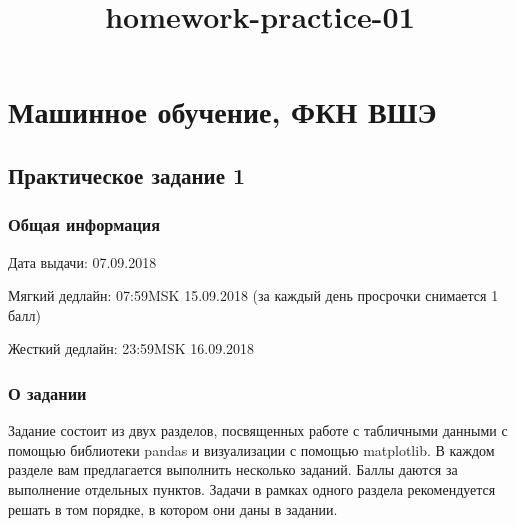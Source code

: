 \documentclass[11pt]{article}
\title{homework-practice-01}
\begin{document}
    
    
    \maketitle
    
    

    
    \hypertarget{ux43cux430ux448ux438ux43dux43dux43eux435-ux43eux431ux443ux447ux435ux43dux438ux435-ux444ux43aux43d-ux432ux448ux44d}{%
\section{Машинное обучение, ФКН
ВШЭ}\label{ux43cux430ux448ux438ux43dux43dux43eux435-ux43eux431ux443ux447ux435ux43dux438ux435-ux444ux43aux43d-ux432ux448ux44d}}

\hypertarget{ux43fux440ux430ux43aux442ux438ux447ux435ux441ux43aux43eux435-ux437ux430ux434ux430ux43dux438ux435-1}{%
\subsection{Практическое задание
1}\label{ux43fux440ux430ux43aux442ux438ux447ux435ux441ux43aux43eux435-ux437ux430ux434ux430ux43dux438ux435-1}}

\hypertarget{ux43eux431ux449ux430ux44f-ux438ux43dux444ux43eux440ux43cux430ux446ux438ux44f}{%
\subsubsection{Общая
информация}\label{ux43eux431ux449ux430ux44f-ux438ux43dux444ux43eux440ux43cux430ux446ux438ux44f}}

Дата выдачи: 07.09.2018

Мягкий дедлайн: 07:59MSK 15.09.2018 (за каждый день просрочки снимается
1 балл)

Жесткий дедлайн: 23:59MSK 16.09.2018

    \hypertarget{ux43e-ux437ux430ux434ux430ux43dux438ux438}{%
\subsubsection{О
задании}\label{ux43e-ux437ux430ux434ux430ux43dux438ux438}}

Задание состоит из двух разделов, посвященных работе с табличными
данными с помощью библиотеки pandas и визуализации с помощью matplotlib.
В каждом разделе вам предлагается выполнить несколько заданий. Баллы
даются за выполнение отдельных пунктов. Задачи в рамках одного раздела
рекомендуется решать в том порядке, в котором они даны в задании.
\end{document}
